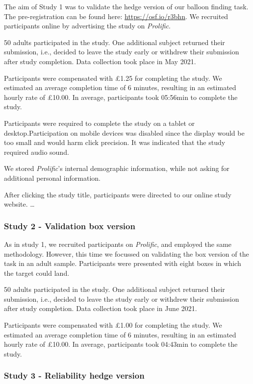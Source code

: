 \documentclass[
  english,
  man,floatsintext]{apa6}
\begin{document}
The aim of Study 1 was to validate the hedge version of our balloon finding task. The pre-registration can be found here: \url{https://osf.io/r3bhn}. We recruited participants online by advertising the study on \emph{Prolific}.

50 adults participated in the study. One additional subject returned their submission, i.e., decided to leave the study early or withdrew their submission after study completion. Data collection took place in May 2021.

Participants were compensated with £1.25 for completing the study. We estimated an average completion time of 6 minutes, resulting in an estimated hourly rate of £10.00. In average, participants took 05:56min to complete the study.

Participants were required to complete the study on a tablet or desktop.Participation on mobile devices was disabled since the display would be too small and would harm click precision. It was indicated that the study required audio sound.

We stored \emph{Prolific}'s internal demographic information,
while not asking for additional personal information.

After clicking the study title, participants were directed to our online study website.
\ldots{}

\hypertarget{study-2---validation-box-version}{%
\subsubsection{Study 2 - Validation box version}\label{study-2---validation-box-version}}

As in study 1, we recruited participants on \emph{Prolific}, and employed the same methodology. However, this time we focussed on validating the box version of the task in an adult sample. Participants were presented with eight boxes in which the target could land.

50 adults participated in the study. One additional subject returned their submission, i.e., decided to leave the study early or withdrew their submission after study completion. Data collection took place in June 2021.

Participants were compensated with £1.00 for completing the study. We estimated an average completion time of 6 minutes, resulting in an estimated hourly rate of £10.00. In average, participants took 04:43min to complete the study.

\hypertarget{study-3---reliability-hedge-version}{%
\subsubsection{Study 3 - Reliability hedge version}\label{study-3---reliability-hedge-version}}
\end{document}
